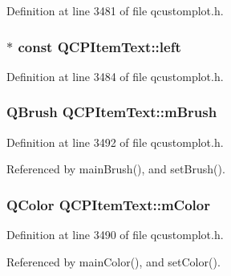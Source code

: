 Definition at line 3481 of file qcustomplot.\+h.

\hypertarget{class_q_c_p_item_text_ab8c6c6e1df36256986fab1463c0a1d38}{}
\subsubsection[{left}]{$\ast$ const Q\+C\+P\+Item\+Text\+::left}\label{class_q_c_p_item_text_ab8c6c6e1df36256986fab1463c0a1d38}


Definition at line 3484 of file qcustomplot.\+h.

\hypertarget{class_q_c_p_item_text_a2535911875faa459b8337f2efccb5cb8}{}
\subsubsection[{m\+Brush}]{\setlength{\rightskip}{0pt plus 5cm}Q\+Brush Q\+C\+P\+Item\+Text\+::m\+Brush\hspace{0.3cm}{\ttfamily [protected]}}\label{class_q_c_p_item_text_a2535911875faa459b8337f2efccb5cb8}


Definition at line 3492 of file qcustomplot.\+h.



Referenced by main\+Brush(), and set\+Brush().

\hypertarget{class_q_c_p_item_text_a8407f284ad867f627878cc26ef433d08}{}
\subsubsection[{m\+Color}]{\setlength{\rightskip}{0pt plus 5cm}Q\+Color Q\+C\+P\+Item\+Text\+::m\+Color\hspace{0.3cm}{\ttfamily [protected]}}\label{class_q_c_p_item_text_a8407f284ad867f627878cc26ef433d08}


Definition at line 3490 of file qcustomplot.\+h.



Referenced by main\+Color(), and set\+Color().

\hypertarget{class_q_c_p_item_text_a1dc87fe2a824820d549ffd7e644eef8d}{}

